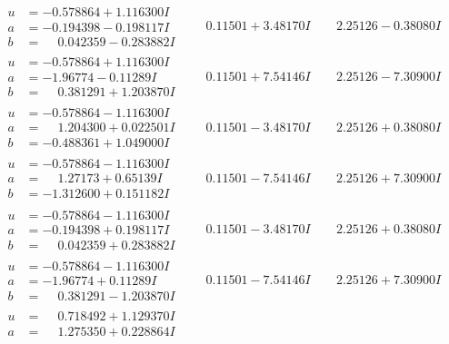 \documentclass[1p]{elsarticle_modified}
\theoremstyle{definition}
\begin{document}
$$\begin{array}{c|c|c}
 \hline 
\begin{aligned}
u &= -0.578864 + 1.116300 I \\
a &= -0.194398 - 0.198117 I \\
b &= \phantom{-}0.042359 - 0.283882 I\end{aligned}
 & \phantom{-}0.11501 + 3.48170 I & \phantom{-}2.25126 - 0.38080 I \\ \hline\begin{aligned}
u &= -0.578864 + 1.116300 I \\
a &= -1.96774 - 0.11289 I \\
b &= \phantom{-}0.381291 + 1.203870 I\end{aligned}
 & \phantom{-}0.11501 + 7.54146 I & \phantom{-}2.25126 - 7.30900 I \\ \hline\begin{aligned}
u &= -0.578864 - 1.116300 I \\
a &= \phantom{-}1.204300 + 0.022501 I \\
b &= -0.488361 + 1.049000 I\end{aligned}
 & \phantom{-}0.11501 - 3.48170 I & \phantom{-}2.25126 + 0.38080 I \\ \hline\begin{aligned}
u &= -0.578864 - 1.116300 I \\
a &= \phantom{-}1.27173 + 0.65139 I \\
b &= -1.312600 + 0.151182 I\end{aligned}
 & \phantom{-}0.11501 - 7.54146 I & \phantom{-}2.25126 + 7.30900 I \\ \hline\begin{aligned}
u &= -0.578864 - 1.116300 I \\
a &= -0.194398 + 0.198117 I \\
b &= \phantom{-}0.042359 + 0.283882 I\end{aligned}
 & \phantom{-}0.11501 - 3.48170 I & \phantom{-}2.25126 + 0.38080 I \\ \hline\begin{aligned}
u &= -0.578864 - 1.116300 I \\
a &= -1.96774 + 0.11289 I \\
b &= \phantom{-}0.381291 - 1.203870 I\end{aligned}
 & \phantom{-}0.11501 - 7.54146 I & \phantom{-}2.25126 + 7.30900 I \\ \hline\begin{aligned}
u &= \phantom{-}0.718492 + 1.129370 I \\
a &= \phantom{-}1.275350 + 0.228864 I \\

\end{aligned}
\end{array}$$
\end{document}
